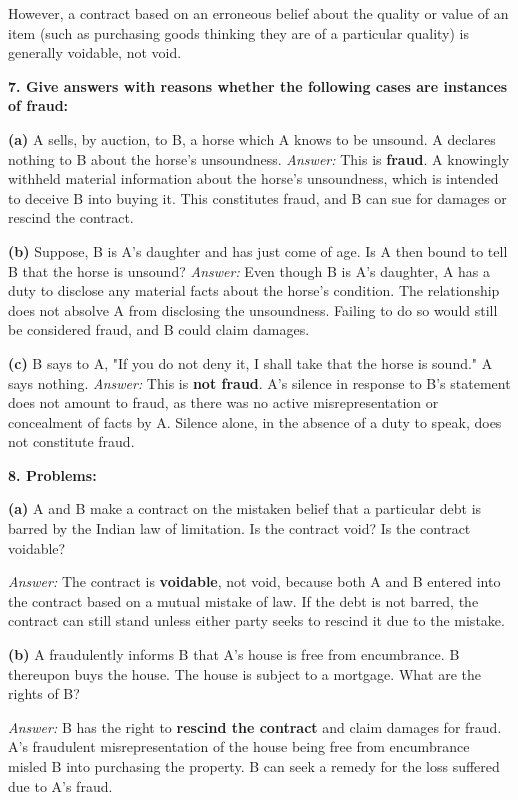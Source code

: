 \documentclass[12pt,a4paper]{book}
\begin{document}
However, a contract based on an erroneous belief about the quality or value of an item (such as purchasing goods thinking they are of a particular quality) is generally voidable, not void.

\vspace{0.5cm}
\textbf{7. Give answers with reasons whether the following cases are instances of fraud:}

\textbf{(a)} A sells, by auction, to B, a horse which A knows to be unsound. A declares nothing to B about the horse's unsoundness.  
\textit{Answer:}  
This is \textbf{fraud}. A knowingly withheld material information about the horse’s unsoundness, which is intended to deceive B into buying it. This constitutes fraud, and B can sue for damages or rescind the contract.

\textbf{(b)} Suppose, B is A's daughter and has just come of age. Is A then bound to tell B that the horse is unsound?  
\textit{Answer:}  
Even though B is A's daughter, A has a duty to disclose any material facts about the horse’s condition. The relationship does not absolve A from disclosing the unsoundness. Failing to do so would still be considered fraud, and B could claim damages.

\textbf{(c)} B says to A, "If you do not deny it, I shall take that the horse is sound." A says nothing.  
\textit{Answer:}  
This is \textbf{not fraud}. A's silence in response to B’s statement does not amount to fraud, as there was no active misrepresentation or concealment of facts by A. Silence alone, in the absence of a duty to speak, does not constitute fraud.

\vspace{0.5cm}
\textbf{8. Problems:}

\textbf{(a)} A and B make a contract on the mistaken belief that a particular debt is barred by the Indian law of limitation. Is the contract void? Is the contract voidable? 

\textit{Answer:}  
The contract is \textbf{voidable}, not void, because both A and B entered into the contract based on a mutual mistake of law. If the debt is not barred, the contract can still stand unless either party seeks to rescind it due to the mistake.

\textbf{(b)} A fraudulently informs B that A's house is free from encumbrance. B thereupon buys the house. The house is subject to a mortgage. What are the rights of B? 

\textit{Answer:}  
B has the right to \textbf{rescind the contract} and claim damages for fraud. A's fraudulent misrepresentation of the house being free from encumbrance misled B into purchasing the property. B can seek a remedy for the loss suffered due to A’s fraud.
\end{document}
